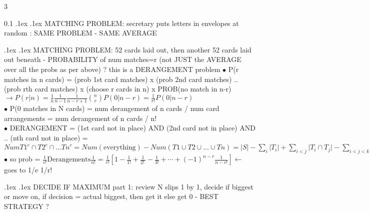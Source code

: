 \documentclass[10pt,landscape,a4paper]{article}
\makeatletter
\renewcommand{\section}{\@startsection{section}{1}{0mm}%
                                {.1ex}%
                                {.1ex}%
                                {\color{blue}\sffamily\small\bfseries}}
\makeatother
\begin{document}
\begin{multicols*}{3}
\begin{spacing}{0.1}
\section{MATCHING PROBLEM: secretary puts letters in envelopes at random : SAME PROBLEM - SAME AVERAGE}

\section{MATCHING PROBLEM: 52 cards laid out, then another 52 cards laid out beneath - PROBABILITY of num matches=r (not JUST the AVERAGE over all the probs as per above) ? this is a DERANGEMENT problem}
$\bullet$ P(r matches in n cards) = (prob 1st card matches) x (prob 2nd card matches) .. (prob rth card matches) x (choose r cards in n) x PROB(no match in n-r) $\rightarrow P(r|n)=\frac{1}{n} \frac{1}{n-1} \frac{1}{n-r+1} \binom{n}{r}P(0|n-r) = \frac{1}{r!} P(0|n-r) $\\
$\bullet$ P(0 matches in N cards) = num derangement of n cards / num card arrangements =  num derangement of n cards / n! \\
$\bullet$ DERANGEMENT = (1st card not in place) AND (2nd card not in place) AND .. (nth card not in place) = $ Num {T1}^c \cap {T2}^c \cap ... {Tn}^c = Num(\text{everything}) - Num ({T1} \cup {T2} \cup ... \cup {Tn}) =\lvert S\rvert-\sum_{i}\vert T_i\rvert+\sum_{i<j}\lvert T_i\cap T_j\rvert-\sum_{i<j<k}\lvert T_i\cap T_j\cap T_k\rvert+\cdots+(-1)^n\lvert T_1\cap\cdots\cap T_n\rvert = n!-\binom{n}{1}(n-1)!+\binom{n}{2}(n-2)!-\binom{n}{3}(n-3)!+\cdots+(-1)^n\binom{n}{n}(n-n)! = = n!-\frac{n!}{1!}+\frac{n!}{2!}-\frac{n!}{3!}+\cdots+(-1)^n\frac{n!}{n!}=n!\left[1-\frac{1}{1!}+\frac{1}{2!~}-\frac{1}{3!}+\cdots+(-1)^n\frac{1}{n!}\right].$\\
$\bullet$ so prob = $\frac{1}{r!} \text{Derangements} \frac{1}{n!} = \frac{1}{r!} \left[1-\frac{1}{1!}+\frac{1}{2!~}-\frac{1}{3!}+\cdots+(-1)^{n-r}\frac{1}{n-r!}\right]  \leftarrow $ goes to  1/e 1/r! 

\section{DECIDE IF MAXIMUM part 1: review N slips 1 by 1, decide if biggest or move on, if decision = actual biggest, then get it else get 0 - BEST STRATEGY ?}


\end{spacing}
\end{multicols*}
\end{document}
